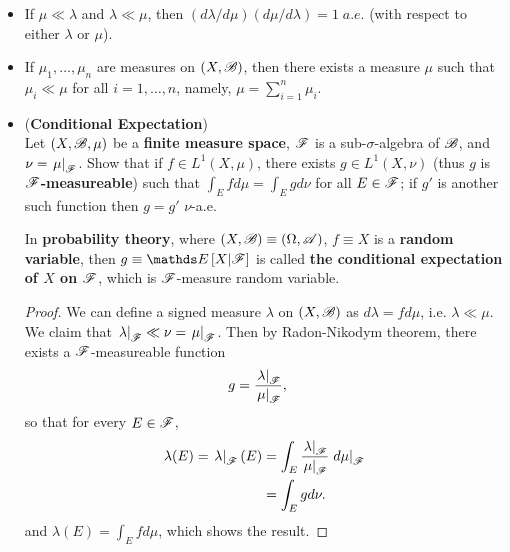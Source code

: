 \documentclass[11pt]{article}
\begin{document}
\begin{itemize}
\begin{proof}
\begin{enumerate}
\item Let $g = \ind{E}\paren{\frac{d \nu}{d\mu }}$ and replace $\nu, \mu$ with $\mu, \lambda$, we have
\begin{align*}
\int\ind{E}d\nu = \int \ind{E}\paren{\frac{d \nu}{d\mu}} d\mu &= \int \ind{E}\paren{\frac{d \nu}{d\mu}}\frac{d\mu}{d\lambda}d\lambda
\end{align*}  for any $E$ measureable.
Therefore, 
 \begin{align*}
 \frac{d\nu}{d\lambda} &= \frac{d\nu}{d\mu}\frac{d\mu}{d\lambda}, \;\; \lambda\text{-}a.e.\qed
 \end{align*}
\end{enumerate}
\end{proof}

\item \begin{corollary}
If $\mu \ll \lambda$ and $\lambda \ll \mu$, then $(d\lambda / d\mu)(d\mu / d\lambda) = 1\; a.e$. (with respect to either $\lambda$ or $\mu$).
\end{corollary}
 
\item \begin{proposition} If $\mu_{1}, \ldots, \mu_{n}$ are measures on $(X,{\mathscr B})$, then there exists a measure $\mu$ such that $\mu_{i}\ll \mu$ for all $i=1,\ldots,n$, namely, $\mu= \sum_{i=1}^{n}\mu_{i}$.
\end{proposition}


\item  \begin{exercise} (\textbf{Conditional Expectation})\\
Let $(X, {\mathscr B}, \mu)$ be a \textbf{finite measure space}, ${\mathscr F}$ is a sub-$\sigma$-algebra of ${\mathscr B}$, and $\nu= \left.{\mu}\right\vert_{{\mathscr F}}$. Show that if $f\in L^{1}(X, \mu)$, there exists $g\in L^{1}(X, \nu)$ (thus $g$ is \textbf{${\mathscr F}$-measureable}) such that $\int_{E} f d\mu = \int_{E} g d\nu $ for all $E\in {\mathscr F}$; if $g'$ is another such function then $g= g'$ $\nu$-a.e. 

In \textbf{probability theory}, where $(X,{\mathscr B})\equiv (\Omega, {\mathscr A})$, $f\equiv X$ is a \textbf{random variable}, then $g\equiv \E{}{X| \srF}$ is called \textbf{the conditional expectation of $X$ on ${\mathscr F}$}, which is ${\mathscr F}$-measure random variable.
\end{exercise}
\begin{proof}
We can define a signed measure $\lambda$ on $(X, {\mathscr B})$ as $d\lambda = f d\mu$, i.e. $\lambda \ll \mu$. We claim that $\left.{\lambda}\right\vert_{{\mathscr F}} \ll \nu= \left.{\mu}\right\vert_{{\mathscr F}}$. Then by Radon-Nikodym theorem, there exists a ${\mathscr F}$-measureable function 
\begin{align*}
g &= \frac{\left.{\lambda}\right\vert_{{\mathscr F}}}{\left.{\mu}\right\vert_{{\mathscr F}}},
\end{align*} so that for every $E\in {\mathscr F}$,
\begin{align*}
\lambda(E)= \left.{\lambda}\right\vert_{{\mathscr F}}(E)&=  \int_{E} \frac{\left.{\lambda}\right\vert_{{\mathscr F}}}{\left.{\mu}\right\vert_{{\mathscr F}}} \left.{d\mu}\right\vert_{{\mathscr F}}\\
 &= \int_{E}g d\nu.
\end{align*}
and $\lambda(E) = \int_{E} f d\mu$, which shows the result.


\end{proof}
\end{itemize}
\end{document}
